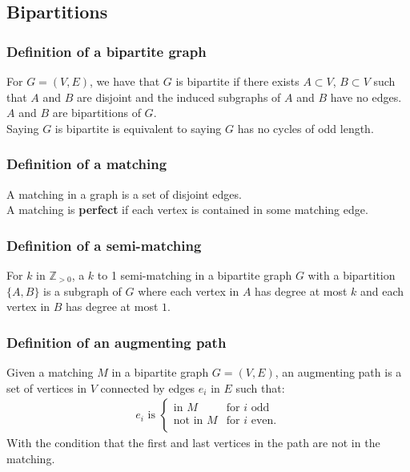 \documentclass[a4paper, 12pt, twoside]{article}
\begin{document}
\subsection{Bipartitions}

\subsubsection{Definition of a bipartite graph}

For $G = (V, E)$, we have that $G$ is bipartite if there exists
$A \subset V$, $B \subset V$ such that $A$ and $B$ are disjoint
and the induced subgraphs of $A$ and $B$ have no edges. $A$
and $B$ are bipartitions of $G$.
\\[\baselineskip]
Saying $G$ is bipartite is equivalent to saying $G$ has no
cycles of odd length.
 
\subsubsection{Definition of a matching}

A matching in a graph is a set of disjoint edges.
\\[\baselineskip]
A matching is \textbf{perfect} if each vertex is contained in
some matching edge.

\subsubsection{Definition of a semi-matching}

For $k$ in $\mathbb{Z}_{>0}$, a $k$ to 1 semi-matching in a
bipartite graph $G$ with a bipartition $\{A, B\}$ is a subgraph
of $G$ where each vertex in $A$ has degree at most $k$ and
each vertex in $B$ has degree at most $1$.

\subsubsection{Definition of an augmenting path}

Given a matching $M$ in a bipartite graph $G = (V, E)$, 
an augmenting path is a set of vertices in $V$ connected
by edges $e_i$ in $E$ such that: \begin{align*}
  e_i \text{ is } \begin{cases}
    \text{in } M & \text{for } i \text{ odd} \\
    \text{not in } M & \text{for } i \text{ even}. \\
  \end{cases}
\end{align*} With the condition that the first and last vertices
in the path are not in the matching.
\end{document}
